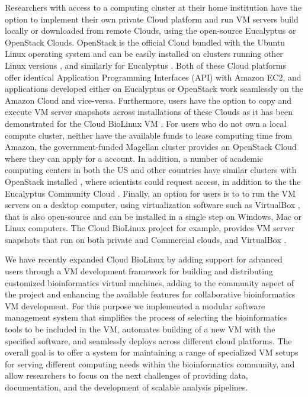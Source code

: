 \documentclass[10pt]{bmc_article}
\newenvironment{bmcformat}{\baselineskip20pt\sloppy\setboolean{publ}{false}}{\baselineskip20pt\sloppy}
\begin{document}
\begin{bmcformat}
Researchers with access to a computing cluster at their home institution have the option to implement their own private Cloud 
platform and run VM servers build locally or downloaded from remote Clouds, using the open-source Eucalyptus \cite{euca} or 
OpenStack \cite{openstack} Clouds. OpenStack is the official Cloud  bundled with the Ubuntu Linux operating system \cite{ubuntucloud} 
and can be easily installed on clusters running other  Linux versions \cite{openstackother}, and similarly for Eucalyptus \cite{eucalyptusother}. 
Both of these Cloud  platforms offer identical Application Programming Interfaces (API) with Amazon EC2, and applications developed 
either on Eucalyptus or OpenStack work seamlessly on the Amazon Cloud and vice-versa. Furthermore, users have the option to 
copy and execute VM server snapshots across installations of these Clouds as it has been demonstrated for the Cloud BioLinux VM \cite{Krampis2012}.
For users who do not own a local compute cluster, neither have the available funds to lease computing time from 
Amazon, the government-funded Magellan cluster \cite{magellan} provides an OpenStack Cloud where they can apply 
for a  account. In addition, a number of academic computing centers in both the US and other countries have similar clusters 
with OpenStack installed \cite{openstackinstalls}, where scientists could request access, in addition to the  the Eucalyptus Community Cloud \cite{ecc}. 
Finally, an option for users is to to run the VM servers on a desktop  computer, using virtualization software such as VirtualBox \cite{vbox}, that is also 
open-source and can be installed in a single step on Windows, Mac or Linux  computers. The Cloud BioLinux project for example, 
provides  VM server snapshots that run on both private and Commercial clouds, and VirtualBox \cite{cblorg}. 
 \pb

We have recently expanded Cloud BioLinux by adding support for advanced users through a VM development framework for building and 
distributing customized bioinformatics virtual machines, adding to the community aspect of the project and enhancing the available 
features for collaborative bioinformatics VM development. For this purpose we implemented a modular software management system that 
simplifies the process of selecting the bioinformatics tools to be included in the VM, automates building of a new VM with the specified 
software, and seamlessly deploys across different cloud platforms. The overall goal is to offer a system for maintaining a range of specialized 
VM setups for serving different computing needs within the bioinformatics community, and allow researchers to focus on the next challenges 
of providing data, documentation, and the development of scalable analysis pipelines.  \pb



\end{bmcformat}
\end{document}
